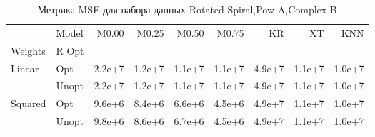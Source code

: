 \begin{table}
\caption{Метрика MSE для набора данных Rotated Spiral,Pow A,Complex B}
\label{tab:MSE_Rotated Spiral,Pow A,Complex B}
\begin{tabular}{llrrrrrrr}
\toprule
 & Model & M0.00 & M0.25 & M0.50 & M0.75 & KR & XT & KNN \\
Weights & R Opt &  &  &  &  &  &  &  \\
\midrule
\multirow[t]{2}{*}{Linear} & Opt & 2.2e+7 & 1.2e+7 & 1.1e+7 & 1.1e+7 & 4.9e+7 & 1.1e+7 & 1.0e+7 \\
 & Unopt & 2.2e+7 & 1.2e+7 & 1.1e+7 & 1.1e+7 & 4.9e+7 & 1.1e+7 & 1.0e+7 \\

\multirow[t]{2}{*}{Squared} & Opt & 9.6e+6 & 8.4e+6 & 6.6e+6 & 4.5e+6 & 4.9e+7 & 1.1e+7 & 1.0e+7 \\
 & Unopt & 9.8e+6 & 8.6e+6 & 6.7e+6 & 4.5e+6 & 4.9e+7 & 1.1e+7 & 1.0e+7 \\

\bottomrule
\end{tabular}
\end{table}
